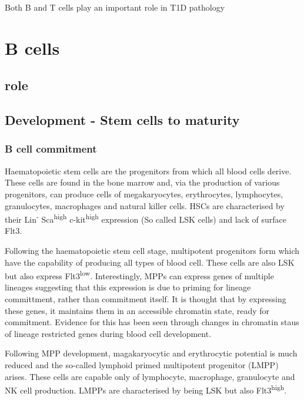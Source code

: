 Both B and T cells play an important role in T1D pathology




\section{B cells}
\subsection{role}
\subsection{Development - Stem cells to maturity}
\label{subsec:Bcelldevelopment}
\subsubsection{B cell commitment}

Haematopoietic stem cells are the progenitors from which all blood cells derive.
These cells are found in the bone marrow and, via the production of various progenitors, can produce cells of megakaryocytes, erythrocytes, lymphocytes, granulocytes, macrophages and natural killer cells.
HSCs are characterised by their Lin\textsuperscript{-} Sca\textsuperscript{high} c-kit\textsuperscript{high} expression (So called LSK cells) and lack of surface Flt3\citep{Welinder2011}.

Following the haematopoietic stem cell stage, multipotent progenitors form which have the capability of producing all types of blood cell.
These cells are also LSK but also express Flt3\textsuperscript{low}\citep{Welinder2011}.
Interestingly, MPPs can express genes of multiple lineages \citep{Hu1997} suggesting that this expression is due to priming for lineage committment, rather than commitment itself.
It is thought that by expressing these genes, it maintains them in an accessible chromatin state, ready for commitment\citep{Welinder2011}.
Evidence for this has been seen through changes in chromatin staus of lineage restricted genes during blood cell development\citep{Weishaupt2010}.

Following MPP development, magakaryocytic and erythrocytic potential is much reduced and the so-called lymphoid primed multipotent progenitor (LMPP) arises.
These cells are capable only of lymphocyte, macrophage, granulocyte and NK cell production\citep{Adolfsson2005}.
LMPPs are characterised by being LSK but also Flt3\textsuperscript{high}.

